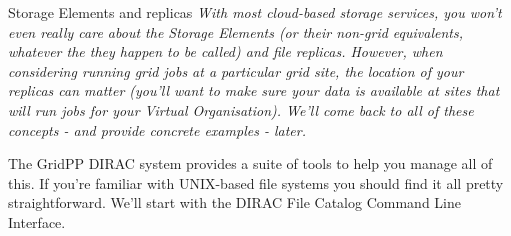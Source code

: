 \begin{infobox}{Storage Elements and replicas}
\emph{With most cloud-based storage services, you won't even really care about
the Storage Elements (or their non-grid equivalents, whatever the they
happen to be called) and file replicas. However, when considering
running grid jobs at a particular grid site, the location of your
replicas can matter (you'll want to make sure your data is available at
sites that will run jobs for your Virtual Organisation). We'll come back
to all of these concepts - and provide concrete examples - later.}
\end{infobox}

The GridPP DIRAC system provides a suite of tools to help you manage all
of this. If you're familiar with UNIX-based file systems you should find
it all pretty straightforward. We'll start with the
DIRAC File Catalog Command Line Interface.











